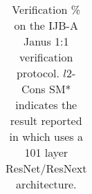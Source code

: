 \documentclass[10pt,twocolumn,letterpaper]{article}
\begin{document}
\begin{table}
\begin{tabular}{l c c c}





\hline
\end{tabular}
\caption{Verification \% on the IJB-A Janus 1:1 verification protocol.  $l2$-Cons SM* indicates the result reported in \cite{ranjan2017l2} which uses a 101 layer ResNet/ResNext architecture.}
\label{tab_janus}
\end{table}

\end{document}
